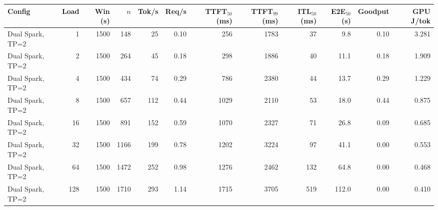\begin{tabular}{l r r r r r r r r r r r}
\toprule
Config & Load & Win (s) & $n$ & Tok/s & Req/s & TTFT$_{50}$ (ms) & TTFT$_{99}$ (ms) & ITL$_{50}$ (ms) & E2E$_{50}$ (s) & Goodput & GPU J/tok \\
\midrule
Dual Spark, TP=2 & 1 & 1500 & 148 & 25 & 0.10 & 256 & 1783 & 37 & 9.8 & 0.10 & 3.281 \\
Dual Spark, TP=2 & 2 & 1500 & 264 & 45 & 0.18 & 298 & 1886 & 40 & 11.1 & 0.18 & 1.909 \\
Dual Spark, TP=2 & 4 & 1500 & 434 & 74 & 0.29 & 786 & 2380 & 44 & 13.7 & 0.29 & 1.229 \\
Dual Spark, TP=2 & 8 & 1500 & 657 & 112 & 0.44 & 1029 & 2110 & 53 & 18.0 & 0.44 & 0.875 \\
Dual Spark, TP=2 & 16 & 1500 & 891 & 152 & 0.59 & 1070 & 2327 & 71 & 26.8 & 0.09 & 0.685 \\
Dual Spark, TP=2 & 32 & 1500 & 1166 & 199 & 0.78 & 1202 & 3224 & 97 & 41.1 & 0.00 & 0.553 \\
Dual Spark, TP=2 & 64 & 1500 & 1472 & 252 & 0.98 & 1276 & 2462 & 132 & 64.8 & 0.00 & 0.468 \\
Dual Spark, TP=2 & 128 & 1500 & 1710 & 293 & 1.14 & 1715 & 3705 & 519 & 112.0 & 0.00 & 0.410 \\
\bottomrule
\end{tabular}
